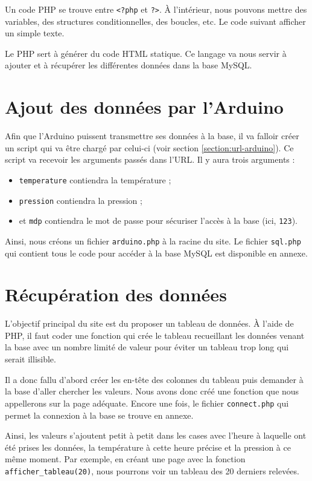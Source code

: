 Un code PHP se trouve entre \verb-<?php- et \verb-?>-. À l'intérieur, nous pouvons mettre des variables, des structures conditionnelles, des boucles, etc. Le code suivant afficher un simple texte.

Le PHP sert à générer du code HTML statique. Ce langage va nous servir à ajouter et à récupérer les différentes données dans la base MySQL.

\section{Ajout des données par l'Arduino}
\label{section:script-arduino}

Afin que l'Arduino puissent transmettre ses données à la base, il va falloir créer un script qui va être chargé par celui-ci (voir section \ref{section:url-arduino}). Ce script va recevoir les arguments passés dans l'URL. Il y aura trois arguments :
\begin{itemize}
	\item \verb-temperature- contiendra la température ;
	\item \verb-pression- contiendra la pression ;
	\item et \verb-mdp- contiendra le mot de passe pour sécuriser l'accès à la base (ici, \verb-123-).
\end{itemize}
Ainsi, nous créons un fichier \verb-arduino.php- à la racine du site. Le fichier \verb-sql.php- qui contient tous le code pour accéder à la base MySQL est disponible en annexe.

\section{Récupération des données}

L'objectif principal du site est du proposer un tableau de données. À l'aide de PHP, il faut coder une fonction qui crée le tableau recueillant les données venant la base avec un nombre limité de valeur pour éviter un tableau trop long qui serait illisible.

Il a donc fallu d'abord créer les en-tête des colonnes du tableau puis demander à la base d'aller chercher les valeurs. Nous avons donc créé une fonction que nous appellerons sur la page adéquate. Encore une fois, le fichier \verb-connect.php- qui permet la connexion à la base se trouve en annexe.

Ainsi, les valeurs s'ajoutent petit à petit dans les cases avec l'heure à laquelle ont été prises les données, la température à cette heure précise et la pression à ce même moment. Par exemple, en créant une page avec la fonction \verb-afficher_tableau(20)-, nous pourrons voir un tableau des 20 derniers relevées.

